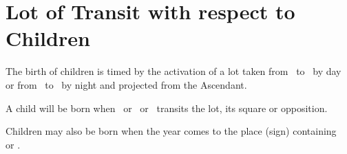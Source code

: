 \section{Lot of Transit with respect to Children}
The birth of children is timed by the activation of a lot taken from \Jupiter\, to \Mars\, by day or from \Mars\, to \Jupiter\, by night and projected from the Ascendant.

A child will be born when \Jupiter\, or \Venus\, or \Saturn\, transits the lot, its square or opposition. 

Children may also be born when the year comes to the place (sign)  containing \Jupiter\, or \Venus.